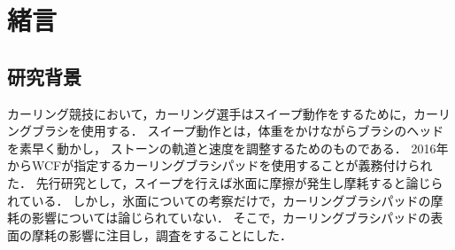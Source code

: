 \documentclass[main]{subfiles}
\begin{document}
\chapter{緒言}
\section{研究背景}
カーリング競技において，カーリング選手はスイープ動作をするために，カーリングブラシを使用する．
スイープ動作とは，体重をかけながらブラシのヘッドを素早く動かし，
ストーンの軌道と速度を調整するためのものである．
2016年からWCFが指定するカーリングブラシパッドを使用することが義務付けられた．
先行研究として，スイープを行えば氷面に摩擦が発生し摩耗すると論じられている\cite{ref:maeno2016}．
しかし，氷面についての考察だけで，カーリングブラシパッドの摩耗の影響については論じられていない．
そこで，カーリングブラシパッドの表面の摩耗の影響に注目し，調査をすることにした．
\end{document}
